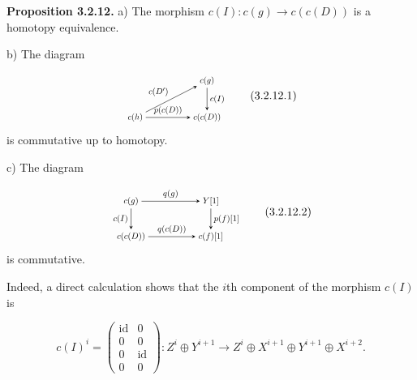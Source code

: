 \clearpage
{}%
\begingroup
\setlength{\abovedisplayskip}{4pt plus 2pt minus 2pt}%
\setlength{\belowdisplayskip}{4pt plus 2pt minus 2pt}%
\noindent\textbf{Proposition 3.2.12.}\quad
{}
a) The morphism
$c(I)\colon c(g)\longrightarrow c(c(D))$ is a homotopy equivalence.

b) The diagram

\begin{equation}
  \begin{tikzpicture}[>=stealth,baseline=(current bounding box.center),scale=0.74,
    every node/.style={transform shape}]
    \node (Ch) at (0,0) {$c(h)$};
    \node (Cg) at (3.0,1.55) {$c(g)$};
    \node (CcD) at (3.0,0) {$c(c(D))$};
    \draw[->] (Ch) -- node[above left] {$c(D')$} (Cg);
    \draw[->] (Cg) -- node[right] {$c(I)$} (CcD);
    \draw[->] (Ch) -- node[above] {$p(c(D))$} (CcD);
  \end{tikzpicture}
  \tag{3.2.12.1}
\end{equation}
is commutative up to homotopy.

c) The diagram

\begin{equation}
  \begin{tikzpicture}[>=stealth,baseline=(current bounding box.center),scale=0.76,
    every node/.style={transform shape}]
    \node (Cg) at (0,1.45) {$c(g)$};
    \node (Y) at (3.25,1.45) {$Y[1]$};
    \node (CcD) at (0,0) {$c(c(D))$};
    \node (Cf) at (3.25,0) {$c(f)[1]$};
    \draw[->] (Cg) -- node[above] {$q(g)$} (Y);
    \draw[->] (Cg) -- node[left] {$c(I)$} (CcD);
    \draw[->] (Y) -- node[right] {$p(f)[1]$} (Cf);
    \draw[->] (CcD) -- node[above] {$q(c(D))$} (Cf);
  \end{tikzpicture}
  \tag{3.2.12.2}
\end{equation}
is commutative.

Indeed, a direct calculation shows that the $i$th component of the morphism
$c(I)$ is

\begin{equation}
  c(I)^i=
  \begin{pmatrix}
    \operatorname{id}&0\\
    0&0\\
    0&\operatorname{id}\\
    0&0
  \end{pmatrix}
  \colon Z^i\oplus Y^{i+1}\longrightarrow
  Z^i\oplus X^{i+1}\oplus Y^{i+1}\oplus X^{i+2}.
  \tag{3.2.12.3}
\end{equation}

